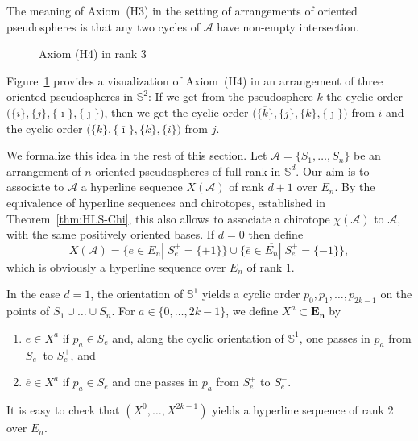 \documentclass[a4paper]{amsart}
\newcommand{\p}{\mathbb S}
\theoremstyle{definition}
\theoremstyle{remark}
\begin{document}
The meaning of Axiom~(H3) in the setting of arrangements of oriented
pseudospheres is that any two cycles of $\mathcal A$ have non-empty
intersection.
\begin{figure}[htbp]
  \begin{center}
    \caption{Axiom (H4) in rank 3}
    \label{fig:G0}
  \end{center}
\end{figure}
Figure~\ref{fig:G0} provides a visualization of Axiom~(H4) in an
arrangement of three oriented pseudospheres in $\p^2$:  If we get from
the pseudosphere $ k$ the cyclic order $\big(\{ i\}, \{ j\},
\{\overline{\imath}\}, \{\overline{\jmath}\}\big)$, then we get the cyclic order
$\big(\{\overline{k}\}, \{ j\}, \{ k\},\{\overline{\jmath}\}\big)$ from $i$
and the cyclic order $\big(\{\overline{ k}\}, \{\overline{\imath}\},
\{k\},\{i\}\big)$ from $ j$.

We formalize this idea in the rest of this section.
Let $\mathcal A=\{S_1,\dots,S_n\}$ be an arrangement of $n$ oriented
pseudospheres of full rank in $\p^d$. Our aim is to associate to
$\mathcal A$ a hyperline sequence $X(\mathcal A)$ of rank $d+1$ over
$E_n$. By the equivalence of hyperline sequences and chirotopes,
established in Theorem~\ref{thm:HLS-Chi}, this also allows to associate a
chirotope $\chi(\mathcal A)$ to $\mathcal A$, with the same
positively oriented bases.
%
If $d=0$ then define
$$ X(\mathcal A) = \big\{e\in E_n|\; S_e^+ = \{+1\}\big\} 
                           \cup \big\{\overline e\in \overline{E_n} |\;
                           S_e^+ = \{-1\}\big\},$$
which is obviously a hyperline sequence over $E_n$ of rank 1.

In the case $d=1$, the orientation of $\p^1$ yields a cyclic order
$p_0,p_1,\dots, p_{2k-1}$ on the points of $S_1\cup\dots\cup S_n$.  For
$a\in \{0,\dots,2k-1\}$, we define $X^a\subset \mathbf{E_n}$ by
\begin{enumerate}
\item $e\in X^a$ if $p_a\in S_e$ and, along the cyclic orientation of
  $\p^1$, one passes in $p_a$ from $S_e^-$ to $S_e^+$, and 
\item $\overline e\in X^a$ if $p_a\in S_e$ and  one passes in $p_a$ from
  $S_e^+$ to $S_e^-$. 
\end{enumerate}
It is easy to check that $(X^0,\dots,X^{2k-1})$ yields a hyperline
sequence of rank 2 over $E_n$.
\end{document}
